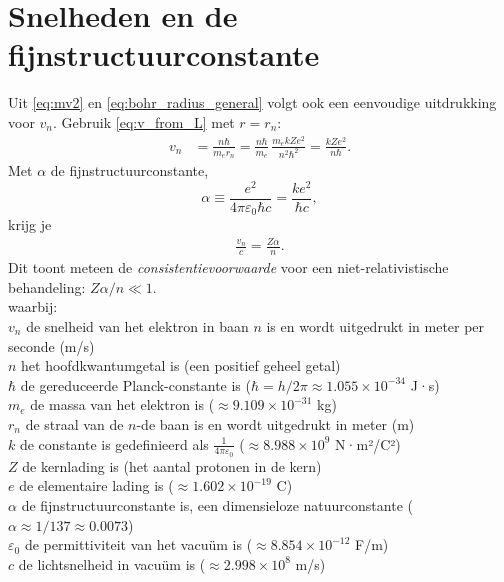 \documentclass{report} %
\begin{document}
    \section{Snelheden en de fijnstructuurconstante}
    Uit \eqref{eq:mv2} en \eqref{eq:bohr_radius_general} volgt ook een eenvoudige uitdrukking voor $v_n$.
    Gebruik \eqref{eq:v_from_L} met $r=r_n$:
    \begin{align}
        v_n &= \frac{n\hbar}{m_e r_n}
        = \frac{n\hbar}{m_e}\,\frac{m_e k Z e^2}{n^2\hbar^2}
        = \frac{k Z e^2}{n\hbar}.
    \end{align}
    Met $\alpha$ de fijnstructuurconstante,
    \[
        \alpha \equiv \frac{e^2}{4\pi\varepsilon_0\hbar c} = \frac{k e^2}{\hbar c},
    \]
    krijg je
    \begin{align}
        \frac{v_n}{c} = \frac{Z\alpha}{n}.
    \end{align}
    Dit toont meteen de \emph{consistentievoorwaarde} voor een niet-relativistische behandeling: $Z\alpha/n\ll 1$.
    \\
    waarbij:\\
    $v_n$ de snelheid van het elektron in baan $n$ is en wordt uitgedrukt in meter per seconde (m/s)\\
    $n$ het hoofdkwantumgetal is (een positief geheel getal)\\
    $\hbar$ de gereduceerde Planck-constante is ($\hbar = h/2\pi \approx 1.055 \times 10^{-34}$ J·s)\\
    $m_e$ de massa van het elektron is ($\approx 9.109 \times 10^{-31}$ kg)\\
    $r_n$ de straal van de $n$-de baan is en wordt uitgedrukt in meter (m)\\
    $k$ de constante is gedefinieerd als $\frac{1}{4\pi\varepsilon_0}$ ($\approx 8.988 \times 10^9$ N·m²/C²)\\
    $Z$ de kernlading is (het aantal protonen in de kern)\\
    $e$ de elementaire lading is ($\approx 1.602 \times 10^{-19}$ C)\\
    $\alpha$ de fijnstructuurconstante is, een dimensieloze natuurconstante ($\alpha \approx 1/137 \approx 0.0073$)\\
    $\varepsilon_0$ de permittiviteit van het vacuüm is ($\approx 8.854 \times 10^{-12}$ F/m)\\
    $c$ de lichtsnelheid in vacuüm is ($\approx 2.998 \times 10^8$ m/s)\\
\end{document}
